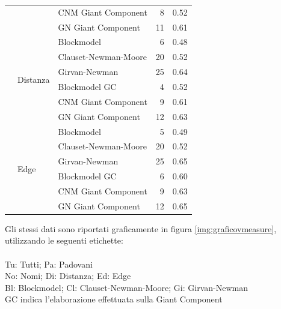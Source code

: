 \documentclass[12pt,a4paper,twoside]{report}
\begin{document}
{\begin{center}
\begin{longtable}{ |l|l|l|r|r| }
        &&CNM Giant Component  &8&0.52\\
        &&GN Giant Component  &11&0.61\\
    \cline{2-5}
        &
        \multirow{6}{4em}{Distanza}
        &Blockmodel &6&0.48\\
        &&Clauset-Newman-Moore &20&0.52\\
        &&Girvan-Newman &25&0.64\\
        &&Blockmodel GC  &4&0.52\\
        &&CNM Giant Component  &9&0.61\\
        &&GN Giant Component  &12&0.63\\
    \cline{2-5}
        &
        \multirow{6}{4em}{Edge}
        &Blockmodel &5&0.49\\
        &&Clauset-Newman-Moore &20&0.52\\
        &&Girvan-Newman &25&0.65\\
        &&Blockmodel GC  &6&0.60\\
        &&CNM Giant Component  &9&0.63\\
        &&GN Giant Component  &12&0.65\\
    \hline
\end{longtable}
\end{center}
}

Gli stessi dati sono riportati graficamente in figura \ref{img:graficovmeasure}, utilizzando le
seguenti etichette:\\
\\
Tu: Tutti; Pa: Padovani\\
No: Nomi; Di: Distanza; Ed: Edge\\
Bl: Blockmodel; Cl: Clauset-Newman-Moore; Gi: Girvan-Newman\\
GC indica l'elaborazione effettuata sulla Giant Component
\end{document}
